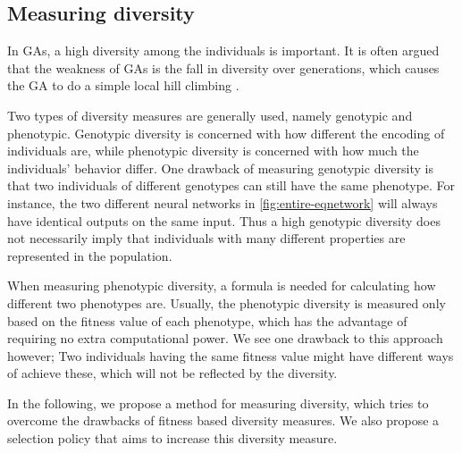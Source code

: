 \subsection{Measuring diversity}
In GAs, a high diversity among the individuals is important. It is often argued that the weakness of GAs is the fall in diversity over generations, which causes the GA to do a simple local hill climbing \citpls{}.

Two types of diversity measures are generally used, namely genotypic and phenotypic\cite{Nguyen:2006:ASPGP}. Genotypic diversity is concerned with how different the encoding of individuals are, while phenotypic diversity is concerned with how much the individuals' behavior differ. One drawback of measuring genotypic diversity is that two individuals of different genotypes can still have the same phenotype. For instance, the two different neural networks in \cref{fig:entire-eqnetwork} will always have identical outputs on the same input. Thus a high genotypic diversity does not necessarily imply that individuals with many different properties are represented in the population.
%

%
When measuring phenotypic diversity, a formula is needed for calculating how different two phenotypes are.
Usually, the phenotypic diversity is measured only based on the fitness value of each phenotype\cite{Nguyen:2006:ASPGP}, which has the advantage of requiring no extra computational power. 
We see one drawback to this approach however; Two individuals having the same fitness value might have different ways of achieve these, which will not be reflected by the diversity. 

In the following, we propose a method for measuring diversity, which tries to overcome the drawbacks of fitness based diversity measures.
We also propose a selection policy that aims to increase this diversity measure.

